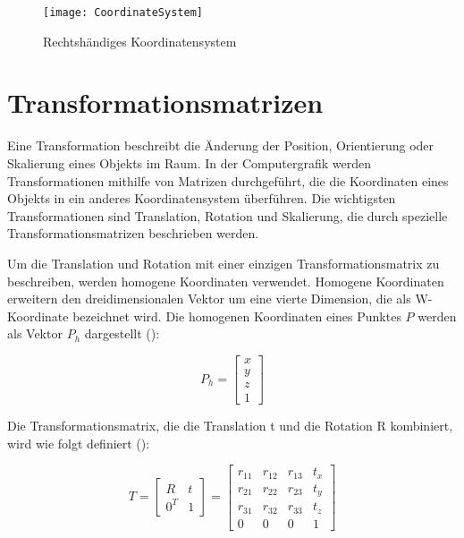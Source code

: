 \begin{figure}
    \centering
    \texttt{[image: CoordinateSystem]}
    \caption{Rechtshändiges Koordinatensystem \cite{noakes2013coordinateSystem}\label{fig:Koordinatensystem}}\par
\end{figure}

\section{Transformationsmatrizen}

Eine Transformation beschreibt die Änderung der Position, Orientierung oder Skalierung eines Objekts im Raum. In der Computergrafik werden Transformationen mithilfe von Matrizen durchgeführt, die die Koordinaten eines Objekts in ein anderes Koordinatensystem überführen. Die wichtigsten Transformationen sind Translation, Rotation und Skalierung, die durch spezielle Transformationsmatrizen beschrieben werden. \cite{doerner2022virtual, gao2021vSLAM, pezzi2021matrices}

Um die Translation und Rotation mit einer einzigen Transformationsmatrix zu beschreiben, werden homogene Koordinaten verwendet. Homogene Koordinaten erweitern den dreidimensionalen Vektor um eine vierte Dimension, die als W-Koordinate bezeichnet wird. Die homogenen Koordinaten eines Punktes \(P\) werden als Vektor \(P_h\) dargestellt (\cite{doerner2022virtual, gao2021vSLAM, freescale2010math3d}):

\begin{equation}
P_h = \begin{bmatrix} x \\ y \\ z \\ 1 \end{bmatrix}
\end{equation}

Die Transformationsmatrix, die die Translation t und die Rotation R kombiniert, wird wie folgt definiert (\cite{doerner2022virtual, gao2021vSLAM, freescale2010math3d}):

\begin{equation}
T = \begin{bmatrix} R & t \\ 0^T & 1 \end{bmatrix} = 
\begin{bmatrix} 
    r_{11} & r_{12} & r_{13} & t_x \\ 
    r_{21} & r_{22} & r_{23} & t_y \\ 
    r_{31} & r_{32} & r_{33} & t_z \\ 
    0 & 0 & 0 & 1 
\end{bmatrix}
\end{equation}

